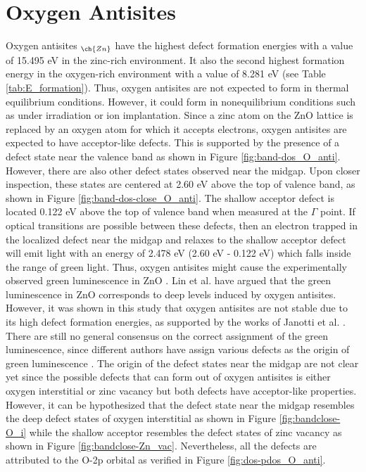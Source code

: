 \section{Oxygen Antisites}
Oxygen antisites $_{\ch{Zn}}$ have the highest defect formation energies with a value of 15.495 eV in the zinc-rich environment. It also the second highest formation energy in the oxygen-rich environment with a value of 8.281 eV (see Table \ref{tab:E_formation}). Thus, oxygen antisites are not expected to form in thermal equilibrium conditions. However, it could form in nonequilibrium conditions such as under irradiation or ion implantation. Since a zinc atom on the ZnO lattice is replaced by an oxygen atom for which it accepts electrons, oxygen antisites are expected to have acceptor-like defects. This is supported by the presence of a defect state near the valence band as shown in Figure \ref{fig:band-dos_O_anti}.  However, there are also other defect states observed near the midgap. Upon closer inspection, these states are centered at 2.60 eV above the top of valence band, as shown in Figure \ref{fig:band-dos-close_O_anti}. The shallow acceptor defect is located 0.122 eV above the top of valence band when measured at the $\Gamma$ point. If optical transitions are possible between these defects, then an electron trapped in the localized defect near the midgap and relaxes to the shallow acceptor defect will emit light with an energy of 2.478 eV  (2.60 eV - 0.122 eV) which falls inside the range of green light. Thus, oxygen antisites might cause the experimentally observed  green luminescence in ZnO \citep{Djurisic2007,Empizo2014,Cizek2015}. Lin et al. \citep{Lin2001} have argued that the green luminescence in ZnO corresponds to deep levels induced by oxygen antisites. However, it was shown in this study that oxygen antisites are not stable due to its high defect formation energies, as supported by the works of Janotti et al. \citep{Janotti2007}. There are still no general consensus on the correct assignment of the green luminescence, since different authors have assign various defects as the origin of green luminescence \citep{Reynolds1997,Oezguer2005,Djurisic2007}. The origin of the defect states near the midgap are not clear yet since the possible defects that can form out of oxygen antisites is either oxygen interstitial or zinc vacancy but both defects have acceptor-like properties. However, it can be hypothesized that the defect state near the midgap resembles the deep defect states of oxygen interstitial as shown in Figure \ref{fig:bandclose-O_i} while the shallow acceptor resembles the defect states of zinc vacancy as shown in Figure \ref{fig:bandclose-Zn_vac}. Nevertheless, all the defects are attributed to the O-2p orbital as  verified in Figure \ref{fig:dos-pdos_O_anti}.


